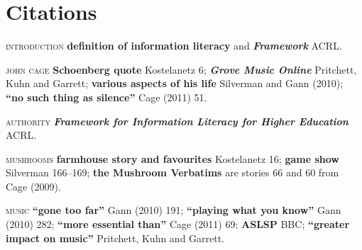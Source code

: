 





\newpageforperformers{}

\section{Citations}

\textsc{introduction}
\textbf{definition of information literacy} and
\textbf{\textit{Framework}} ACRL.

\textsc{john cage}
\textbf{Schoenberg quote} Kostelanetz 6;
\textbf{\textit{Grove Music Online}} Pritchett, Kuhn and Garrett;
\textbf{various aspects of his life} Silverman and Gann (2010);
\textbf{``no such thing as silence''} Cage (2011) 51.

\textsc{authority}
\textbf{\textit{Framework for Information Literacy for Higher Education}} ACRL.

\textsc{mushrooms}
\textbf{farmhouse story and favourites} Kostelanetz 16;
\textbf{game show} Silverman 166--169;
\textbf{the Mushroom Verbatims} are stories 66 and 60 from Cage (2009).

\textsc{music}
\textbf{``gone too far''} Gann (2010) 191;
\textbf{``playing what you know''} Gann (2010) 282;
\textbf{``more essential than''} Cage (2011) 69;
\textbf{ASLSP} BBC;
\textbf{``greater impact on music''} Pritchett, Kuhn and Garrett.

